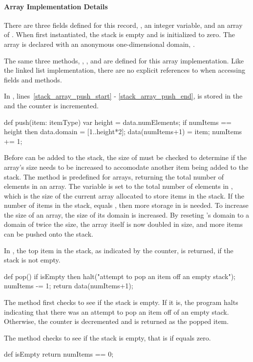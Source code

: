 \paragraph{Array Implementation Details}
There are three fields defined for this  record, ,
an integer variable,  and an array  of .
When first instantiated,
the stack is empty and  is initialized to zero.   The 
array is declared with an anonymous one-dimensional domain, \chpl{[1..2]}.

The same three methods, , , and  are
defined for this array implementation.  Like the linked list implementation,
there are no explicit references to  when accessing fields and
methods.

In , lines~\ref{stack_array_push_start}
- \ref{stack_array_push_end},  is stored in the 
and the  counter is incremented.  
\begin{chapel}
  def push(item: itemType) {       
    var height = data.numElements;  
    if numItems == height then     
      data.domain = [1..height*2];
    data(numItems+1) = item;        
    numItems += 1;                 
  }                               
\end{chapel}
Before  can be added
to the stack, the size of  must be checked to determine if the array's size
needs to be increased to accomodate another item being added to the stack.
The method  is predefined for arrays, returning the total
number of elements in an array.  The variable  is set to the
total number of elements in , which is the size of the current array
allocated to store items in the stack.
If the number of items in the stack,  equals
, then more storage in  is needed.  To increase the
size of an array, the size of its domain is increased.
By reseting 's
domain to a domain of twice the size, the array  itself is now doubled in size,
and more items can be pushed onto the stack. 

In , the top item in the stack, as indicated by the  counter,
is returned, if the stack is not empty.
\begin{chapel}
  def pop() {                       
    if isEmpty then                
      halt("attempt to pop an item off an empty stack"); 
    numItems -= 1;                  
    return data(numItems+1);       
  }
\end{chapel}
The  method first checks to see if the stack is empty.  If it is, the program
halts indicating that there was an attempt to pop an item off of an empty stack.
Otherwise, the  counter is decremented and 
is returned as the popped item.  

The  method checks to see if
the stack is empty, that is if  equals zero.
\begin{chapel}
  def isEmpty return numItems == 0; 
\end{chapel}

